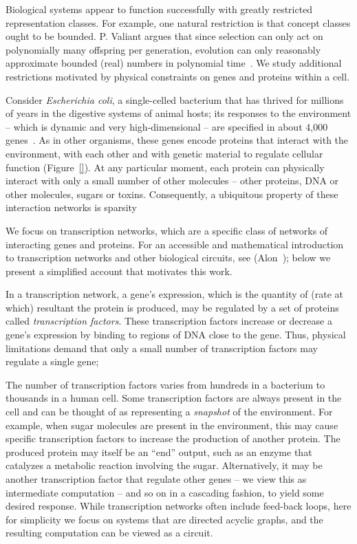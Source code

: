 Biological systems appear to function successfully with greatly restricted
representation classes. For example, one natural restriction is that concept
classes ought to be bounded.
P. Valiant argues that since selection can only act on polynomially many
offspring per generation, evolution can only reasonably approximate bounded
(real) numbers in polynomial time~\cite{Valiant:2012-real}.
We study additional restrictions motivated by physical constraints on
genes and proteins within a cell.

Consider \emph{Escherichia coli}, a single-celled
bacterium that has thrived for millions of years in the digestive systems of
animal hosts; its responses to the environment -- which is dynamic and very
high-dimensional -- are specified in about 4,000 genes~\cite{biology}.
As in other organisms, these genes encode proteins that interact with the
environment, with each other and with genetic material to regulate cellular
function (Figure~\ref{}).
At any particular moment, each protein can physically interact with only
a small number of other molecules -- other proteins, DNA or other molecules,
\eg sugars or toxins.
Consequently, a ubiquitous property of these interaction networks is sparsity

We focus on transcription networks, which are a specific class of networks of
interacting genes and proteins. For an accessible and mathematical introduction to
transcription networks and other biological circuits, see (Alon~\cite{alon});
below we present a simplified account that motivates this work.


In a transcription network, a gene's expression, which is the
quantity of (rate at which) resultant the protein is produced, may be
regulated by a set of proteins called \emph{transcription factors}.
These transcription factors increase or decrease a gene's expression by binding
to regions of DNA close to the gene. 
Thus, physical limitations demand that only a small number of transcription
factors may regulate a single gene; 

The number of transcription factors varies from hundreds in a bacterium to
thousands in a human cell.
Some transcription factors are always present in the cell and can be thought of
as representing a \emph{snapshot} of the environment.
For example, when sugar molecules are present in the environment, this may cause
specific transcription factors to increase the production of another protein.
The produced protein may itself be an ``end'' output, such as an enzyme that
catalyzes a metabolic reaction involving the sugar.
Alternatively, it may be another transcription factor that regulate other genes
-- we view this as intermediate computation -- and so on in a cascading
fashion, to yield some desired response.
While transcription networks often include feed-back loops, here for simplicity
we focus on systems that are directed acyclic graphs, and the resulting
computation can be viewed as a circuit.

